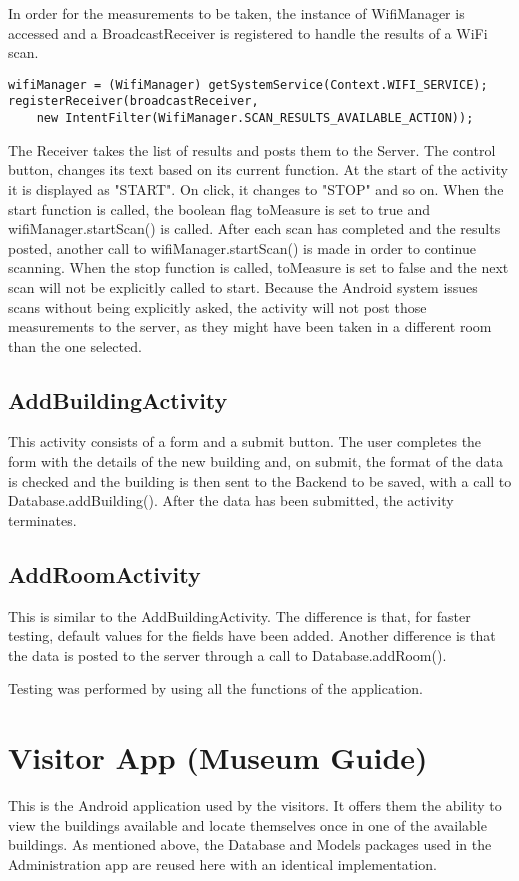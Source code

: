 In order for the measurements to be taken, the instance of WifiManager is accessed and a BroadcastReceiver is registered to handle the results of a WiFi scan.
\begin{lstlisting}
wifiManager = (WifiManager) getSystemService(Context.WIFI_SERVICE);
registerReceiver(broadcastReceiver, 
	new IntentFilter(WifiManager.SCAN_RESULTS_AVAILABLE_ACTION));
\end{lstlisting}
The Receiver takes the list of results and posts them to the Server. The control button, changes its text based on its current function. At the start of the activity it is displayed as "START". On click, it changes to "STOP" and so on. When the start function is called,  the boolean flag toMeasure is set to true and wifiManager.startScan() is called. After each scan has completed and the results posted, another call to wifiManager.startScan() is made in order to continue scanning. When the stop function is called, toMeasure is set to false and the next scan will not be explicitly called to start. Because the Android system issues scans without being explicitly asked, the activity will not post those measurements to the server, as they might have been taken in a different room than the one selected. 
\subsection{AddBuildingActivity}
This activity consists of a form and a submit button. The user completes the form with the details of the new building and, on submit, the format of the data is checked and the building is then sent to the Backend to be saved, with a call to Database.addBuilding(). After the data has been submitted, the activity terminates. 

\subsection{AddRoomActivity}
This is similar to the AddBuildingActivity. The difference is that, for faster testing, default values for the fields have been added. Another difference is that the data is posted to the server through a call to Database.addRoom(). 

Testing was performed by using all the functions of the application.
\section{Visitor App (Museum Guide)}
This is the Android application used by the visitors. It offers them the ability to view the buildings available and locate themselves once in one of the available buildings. As mentioned above, the Database and Models packages used in the Administration app are reused here with an identical implementation.

